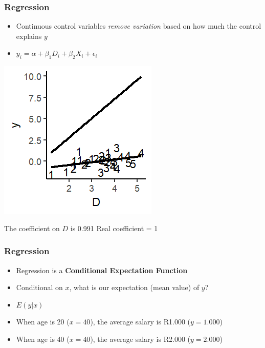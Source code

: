 \documentclass[xcolor=x11names,compress]{beamer}\usepackage[]{graphicx}\usepackage[]{color}
\makeatletter
\def\maxwidth{ %
  \ifdim\Gin@nat@width>\linewidth
    \linewidth
  \else
    \Gin@nat@width
  \fi
}
\newenvironment{knitrout}{}{} %
\renewcommand{\(}{\begin{columns}}
\renewcommand{\)}{\end{columns}}
\newcommand{\<}[1]{\begin{column}{#1}}
\renewcommand{\>}{\end{column}}
\makeatother
\begin{document}
\begin{frame}
\frametitle{Regression}
\begin{itemize}
\item Continuous control variables \textit{remove variation} based on how much the control explains $y$
\item $y_i = \alpha + \beta_1 D_i + \beta_2 X_i + \epsilon_i$
\end{itemize}
\begin{multicols}{2}
\begin{knitrout}
\color{fgcolor}
\includegraphics[width=\maxwidth]{figure/graph_ols_control3-1} 

\end{knitrout}
\columnbreak

The coefficient on $D$ is 0.991
Real coefficient = 1
\end{multicols}
\end{frame}



\begin{frame}
\frametitle{Regression}
\begin{itemize}
\item Regression is a \textbf{Conditional Expectation Function}
\pause
\item Conditional on $x$, what is our expectation (mean value) of $y$?
\pause
\item $E(y|x)$
\pause
\item When age is 20 ($x=40$), the average salary is R1.000 ($y=1.000$)
\item When age is 40 ($x=40$), the average salary is R2.000 ($y=2.000$)
\end{itemize}
\end{frame}
\end{document}
